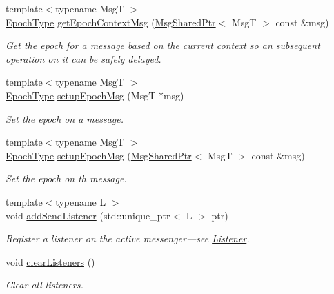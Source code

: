 \begin{DoxyCompactItemize}
{\footnotesize template$<$typename MsgT $>$ }\\\hyperlink{namespacevt_a985a5adf291c34a3ca263b3378388236}{Epoch\+Type} \hyperlink{structvt_1_1messaging_1_1_active_messenger_a66c64223357aa92f45a4a4042bd63a5f}{get\+Epoch\+Context\+Msg} (\hyperlink{structvt_1_1messaging_1_1_msg_shared_ptr}{Msg\+Shared\+Ptr}$<$ MsgT $>$ const \&msg)
\begin{DoxyCompactList}\small\item\em Get the epoch for a message based on the current context so an subsequent operation on it can be safely delayed. \end{DoxyCompactList}\item 
{\footnotesize template$<$typename MsgT $>$ }\\\hyperlink{namespacevt_a985a5adf291c34a3ca263b3378388236}{Epoch\+Type} \hyperlink{structvt_1_1messaging_1_1_active_messenger_a7b5a8fc73617491423bf68c4fbe1e2a2}{setup\+Epoch\+Msg} (MsgT $\ast$msg)
\begin{DoxyCompactList}\small\item\em Set the epoch on a message. \end{DoxyCompactList}\item 
{\footnotesize template$<$typename MsgT $>$ }\\\hyperlink{namespacevt_a985a5adf291c34a3ca263b3378388236}{Epoch\+Type} \hyperlink{structvt_1_1messaging_1_1_active_messenger_ad7402f346c73b2a50ae1feb71140d891}{setup\+Epoch\+Msg} (\hyperlink{structvt_1_1messaging_1_1_msg_shared_ptr}{Msg\+Shared\+Ptr}$<$ MsgT $>$ const \&msg)
\begin{DoxyCompactList}\small\item\em Set the epoch on th message. \end{DoxyCompactList}\item 
{\footnotesize template$<$typename L $>$ }\\void \hyperlink{structvt_1_1messaging_1_1_active_messenger_a3083324696bb4f6e55164da2cb00a1c6}{add\+Send\+Listener} (std\+::unique\+\_\+ptr$<$ L $>$ ptr)
\begin{DoxyCompactList}\small\item\em Register a listener on the active messenger---see {\ttfamily \hyperlink{structvt_1_1messaging_1_1_listener}{Listener}}. \end{DoxyCompactList}\item 
void \hyperlink{structvt_1_1messaging_1_1_active_messenger_af7bcc5ce345c1138a67b6f80abb56705}{clear\+Listeners} ()
\begin{DoxyCompactList}\small\item\em Clear all listeners. \end{DoxyCompactList}\end{DoxyCompactItemize}
